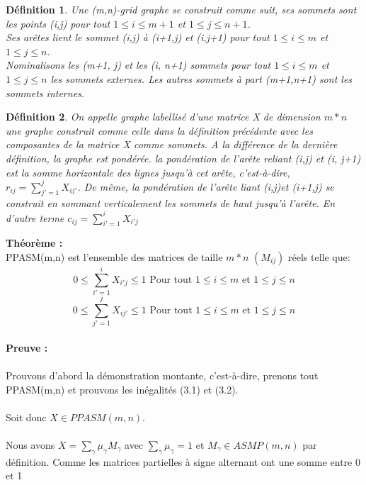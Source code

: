 \documentclass{book}
\newtheorem{petit_nom2}{Définition}[chapter]
\begin{document}
\begin{petit_nom2}
Une (m,n)-grid graphe se construit comme suit, ses sommets sont les points (i,j) pour tout $1 \leqslant i \leqslant m+1$ et $1 \leqslant j \leqslant n+1$. \\ Ses arêtes lient le sommet (i,j) à (i+1,j) et (i,j+1) pour tout $1 \leqslant i \leqslant m$ et $1 \leqslant j \leqslant n$. \\
Nominalisons les (m+1, j) et les (i, n+1) sommets pour tout $1 \leqslant i \leqslant m$ et $1 \leqslant j \leqslant n$ les sommets externes. Les autres sommets à  part (m+1,n+1) sont les sommets internes. \\
\end{petit_nom2}
\begin{petit_nom2}
On appelle graphe labellisé d'une matrice X de dimension $m*n$ une graphe construit comme celle dans la définition précédente avec les composantes de la matrice X comme sommets. A la différence de la dernière définition, la graphe est pondérée. la pondération de l'arête reliant (i,j) et (i, j+1) est la somme horizontale des lignes jusqu'à cet arête, c'est-à-dire, $r_{ij}=\sum_{j'=1}^{j}{X_{ij'}}$. De même, la pondération de l'arête liant (i,j)et (i+1,j) se construit en sommant verticalement les sommets de haut jusqu'à l'arête. En d'autre terme $c_{ij}=\sum_{i'=1}^{i}{X_{i'j}}$
\end{petit_nom2}
\textbf{Théorème :}\\
PPASM(m,n) est l'ensemble des matrices de taille $m*n$ $(M_{ij})$ réels telle que:\\
\begin{equation}
0 \leqslant \sum_{i'=1}^{i}{X_{i'j}} \leqslant 1   \text{ Pour tout } 1 \leqslant i \leqslant m \text{ et } 1 \leqslant j \leqslant n
\end{equation} 
\begin{equation}
0 \leqslant \sum_{j'=1}^{j}{X_{ij'}} \leqslant 1    \text{ Pour tout } 1 \leqslant i \leqslant m \text{ et } 1 \leqslant j \leqslant n
\end{equation}\\ 
\textbf{Preuve : }\\\\
Prouvons d'abord la démonstration montante, c'est-à-dire, prenons tout PPASM(m,n) et prouvons les inégalités (3.1) et (3.2).\\\\
Soit donc $X \in PPASM(m,n)$.\\\\ 
Nous avons $X=\sum_{\gamma}{\mu_\gamma M_\gamma}$ avec $\sum_{\gamma}\mu_\gamma=1$ et $M_\gamma \in ASMP(m,n)$ par définition. Comme les matrices partielles à signe alternant ont une somme entre 0 et 1 
\end{document}
